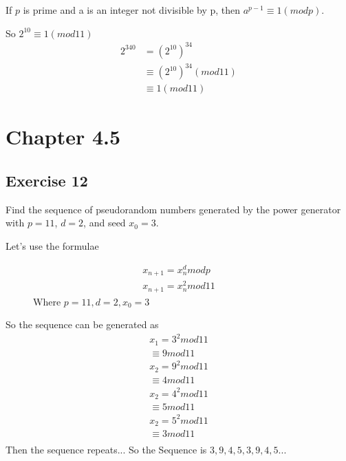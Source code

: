\documentclass[12pt]{article}
\begin{document}
    If $p$ is prime and a is an integer not divisible by p, then
    $a^{p-1}\equiv 1(mod p)$.


    So $2^{10}\equiv 1(mod11)$
    \begin{equation}
      \begin{split}
        2^{340}&=(2^{10})^{34}\\
        &\equiv(2^{10})^{34}(mod11)\\
        &\equiv 1(mod11)
      \end{split}
    \end{equation}

    \section{Chapter 4.5}
    \subsection{Exercise 12}
    Find the sequence of pseudorandom numbers generated by the power generator with $p = 11$, $d=2$, and seed $x_0=3$.



    Let's use the formulae
    \begin{figure}
      \centering
      \begin{equation}
      \begin{split}
        x_{n+1}=x_n^d mod p\\
        x_{n+1}=x_n^2 mod 1 1
      \end{split}
    \end{equation}
    Where $p=11,d=2, x_0=3$
\end{figure}
  
    So the sequence can be generated as
    \begin{equation}
      \begin{split}
        x_1=3^2mod1 1\\
        \equiv 9 mod 1 1\\
        x_2=9^2mod1 1\\
        \equiv 4 mod 1 1\\
        x_2=4^2mod1 1\\
        \equiv 5 mod 1 1\\
        x_2=5^2mod1 1\\
        \equiv 3 mod 1 1\\
      \end{split}
    \end{equation}
    Then the sequence repeats...
    So the Sequence is $3,9,4,5,3,9,4,5...$
\end{document}
